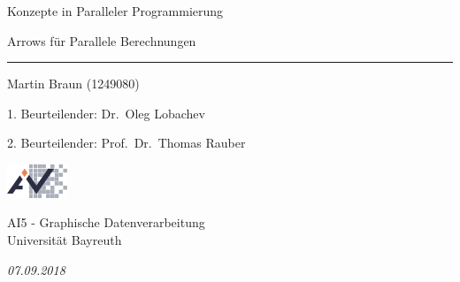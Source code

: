\documentclass[paper=A4,twoside=true,openright,parskip=full,chapterprefix=true,headings=normal,bibliography=totoc,listof=totoc,titlepage=on,captions=tableabove,draft=false,british]{scrreprt}%
\newcommand{\thesisTitleGerman}{Konzepte in Paralleler Programmierung}
\newcommand{\thesisName}{Martin Braun (1249080)}
\newcommand{\thesisDate}{07.09.2018}
\newcommand{\thesisUniversityDepartmentGerman}{AI5 - Graphische Datenverarbeitung}
\begin{document}
\pagestyle{plain}
\begin{abstract}
Arrows are a general functional interface for computation and an
alternative to Monads for API design. In contrast to Monad-based
parallelism, we explore the use of Arrows for specifying generalised
parallelism. Specifically, we define an Arrow-based language and
implement it using multiple parallel Haskells. As each parallel
computation is an Arrow, such parallel Arrows (PArrows) can be readily
composed and transformed. To allow for more sophisticated communication
schemes between computation nodes in distributed systems, we utilise the
concept of Futures to wrap direct communication. Addressing the recent
trends in cloud computing, we also explore the possibility for a cloud
based implementation of this newly created DSL. To show that PArrows
have similar expressive power as existing parallel languages, we
implement several algorithmic skeletons and four benchmarks. The
Benchmarks show that our framework does not induce any notable
performance overhead. We conclude that Arrows have considerable
potential for composing parallel programs and more specifically for
programs that have to be executed with multiple different parallel
language implementations.
\end{abstract}
\cleardoublepage

\begin{titlepage}
\flushright
\hfill
\vfill
{\huge\thesisTitleGerman \par}
{\LARGE Arrows für Parallele Berechnungen \par}
\rule[5pt]{\textwidth}{.4pt} \par
{\Large\thesisName} \par
{1. Beurteilender: \Large Dr.~Oleg Lobachev} \par
{2. Beurteilender: \Large Prof.~Dr.~Thomas Rauber} \par

\vfill
\vspace*{7cm}
%
\begin{minipage}{2cm}
\includegraphics[height=1cm]{src/img/ai5logo.pdf}
\end{minipage}
%
\begin{minipage}{7cm}
\vspace{16pt}
\thesisUniversityDepartmentGerman \\
Universität Bayreuth \\
\end{minipage}
\hfill
\begin{minipage}{3cm}
\vspace*{18pt}
\begin{flushright}
\textit{\large\thesisDate}
\end{flushright}
\end{minipage}
%
\end{titlepage}
\cleardoublepage
\end{document}
